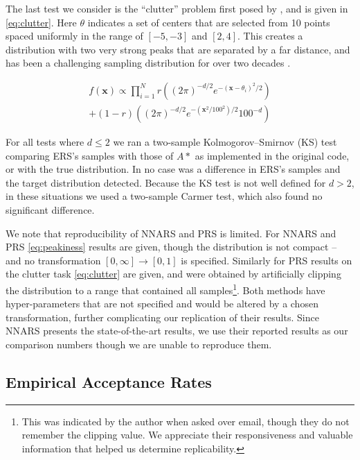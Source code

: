 \documentclass{ecai}  %
\begin{document}
The last test we consider is the ``clutter'' problem first posed by \cite{Minka2001}, and is given in \autoref{eq:clutter}. Here $\theta$ indicates a set of centers that are selected from 10 points spaced uniformly in the range of $[-5, -3]$ and $[2, 4]$. This creates a distribution with two very strong peaks that are separated by a far distance, and has been a challenging sampling distribution for over two decades \cite{Minka2001}. 

%
\begin{multline} 
\label{eq:clutter}
    f(\boldsymbol{x})\propto \prod_{i=1}^N r \left((2 \pi)^{-d/2} e^{-(\bm{x} - \theta_i)^2/2}\right) \\ +  (1-r) \left((2 \pi)^{-d/2} e^{-(\bm{x}^2/100^2)/2} 100^{-d}\right)
\end{multline}
%

For all tests where $d \leq 2$ we ran a two-sample Kolmogorov–Smirnov (KS) test comparing ERS's samples with those of $A*$ as implemented in the original code, or with the true distribution. In no case was a difference in ERS's samples and the target distribution detected. Because the KS test is not well defined for $d > 2$, in these situations we used a  two-sample Carmer test, which also found no significant difference. 

We note that reproducibility of NNARS and PRS is limited. For NNARS and PRS \autoref{eq:peakiness} results are given, though the distribution is not compact -- and no transformation $[0, \infty] \to [0, 1]$ is specified. Similarly for PRS results on the clutter task \autoref{eq:clutter} are given, and were obtained by artificially clipping the distribution to a range that contained all samples\footnote{This was indicated by the author when asked over email, though they do not remember the clipping value. We appreciate their responsiveness and valuable information that helped us determine replicability.}. Both methods have hyper-parameters that are not specified and would be altered by a chosen transformation, further complicating our replication of their results. Since NNARS presents the state-of-the-art results, we use their reported results as our comparison numbers though we are unable to reproduce them. 

%

%

\subsection{Empirical Acceptance Rates}
\end{document}
